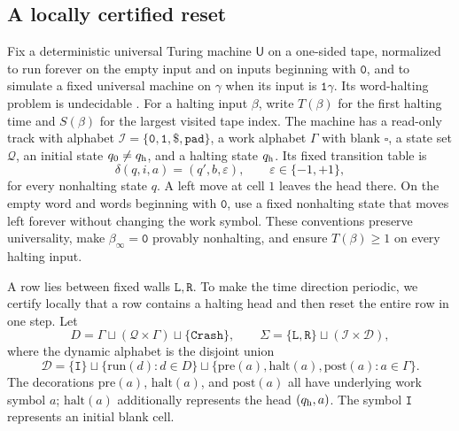 \documentclass[10pt]{article}
\numberwithin{equation}{section}
\theoremstyle{definition}
\begin{document}
\subsection{A locally certified reset}
Fix a deterministic universal Turing machine $\mathsf U$ on a one-sided tape, normalized to run forever on the empty input and on inputs beginning with $\mathtt0$, and to simulate a fixed universal machine on $\gamma$ when its input is $\mathtt1\gamma$. Its word-halting problem is undecidable \cite{Turing1936,Rogers1967}. For a halting input $\beta$, write $T(\beta)$ for the first halting time and $S(\beta)$ for the largest visited tape index. The machine has a read-only track with alphabet $\mathcal I=\{\mathtt0,\mathtt1,\mathtt\$,\mathtt{pad}\}$, a work alphabet $\Gamma$ with blank $\square$, a state set $\mathcal Q$, an initial state $q_0\ne q_{\rm h}$, and a halting state $q_{\rm h}$. Its fixed transition table is
\[
 \delta(q,i,a)=(q',b,\varepsilon),\qquad\varepsilon\in\{-1,+1\},
\]
for every nonhalting state $q$. A left move at cell $1$ leaves the head there. On the empty word and words beginning with $\mathtt0$, use a fixed nonhalting state that moves left forever without changing the work symbol. These conventions preserve universality, make $\beta_\infty=\mathtt0$ provably nonhalting, and ensure $T(\beta)\ge1$ on every halting input.

A row lies between fixed walls $\mathtt L,\mathtt R$. To make the time direction periodic, we certify locally that a row contains a halting head and then reset the entire row in one step. Let
\[
 D=\Gamma\sqcup(\mathcal Q\times\Gamma)\sqcup\{\mathtt{Crash}\},
 \qquad
 \Sigma=\{\mathtt L,\mathtt R\}\sqcup(\mathcal I\times\mathcal D),
\]
where the dynamic alphabet is the disjoint union
\[
 \mathcal D=\{\mathtt I\}\sqcup\{\mathrm{run}(d)\colon d\in D\}
 \sqcup\{\mathrm{pre}(a),\mathrm{halt}(a),\mathrm{post}(a)\colon a\in\Gamma\}.
\]
The decorations $\mathrm{pre}(a)$, $\mathrm{halt}(a)$, and $\mathrm{post}(a)$ all have underlying work symbol $a$; $\mathrm{halt}(a)$ additionally represents the head $(q_{\rm h},a)$. The symbol $\mathtt I$ represents an initial blank cell.
\end{document}

